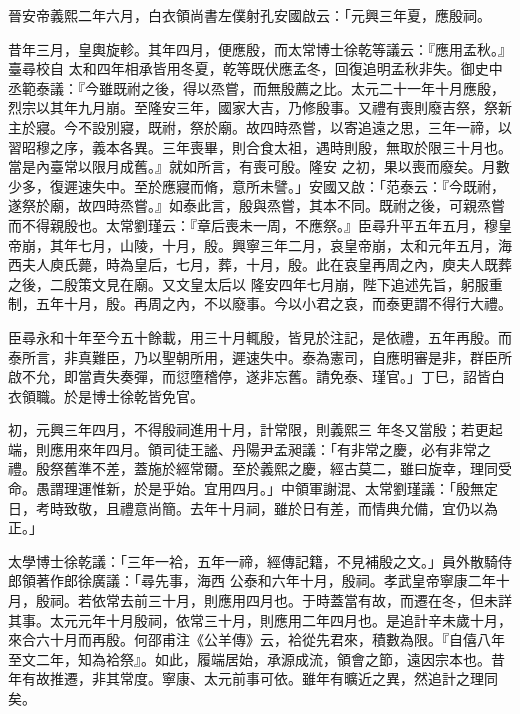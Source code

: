 \begin{pinyinscope}
 晉安帝義熙二年六月，白衣領尚書左僕射孔安國啟云：「元興三年夏，應殷祠。



 昔年三月，皇輿旋軫。其年四月，便應殷，而太常博士徐乾等議云：『應用孟秋。』臺尋校自
 太和四年相承皆用冬夏，乾等既伏應孟冬，回復追明孟秋非失。御史中丞範泰議：『今雖既祔之後，得以烝嘗，而無殷薦之比。太元二十一年十月應殷，烈宗以其年九月崩。至隆安三年，國家大吉，乃修殷事。又禮有喪則廢吉祭，祭新主於寢。今不設別寢，既祔，祭於廟。故四時烝嘗，以寄追遠之思，三年一禘，以習昭穆之序，義本各異。三年喪畢，則合食太祖，遇時則殷，無取於限三十月也。當是內臺常以限月成舊。』就如所言，有喪可殷。隆安
 之初，果以喪而廢矣。月數少多，復遲速失中。至於應寢而脩，意所未譬。」安國又啟：「范泰云：『今既祔，遂祭於廟，故四時烝嘗。』如泰此言，殷與烝嘗，其本不同。既祔之後，可親烝嘗而不得親殷也。太常劉瑾云：『章后喪未一周，不應祭。』臣尋升平五年五月，穆皇帝崩，其年七月，山陵，十月，殷。興寧三年二月，哀皇帝崩，太和元年五月，海西夫人庾氏薨，時為皇后，七月，葬，十月，殷。此在哀皇再周之內，庾夫人既葬之後，二殷策文見在廟。又文皇太后以
 隆安四年七月崩，陛下追述先旨，躬服重制，五年十月，殷。再周之內，不以廢事。今以小君之哀，而泰更謂不得行大禮。



 臣尋永和十年至今五十餘載，用三十月輒殷，皆見於注記，是依禮，五年再殷。而泰所言，非真難臣，乃以聖朝所用，遲速失中。泰為憲司，自應明審是非，群臣所啟不允，即當責失奏彈，而愆墮稽停，遂非忘舊。請免泰、瑾官。」丁巳，詔皆白衣領職。於是博士徐乾皆免官。



 初，元興三年四月，不得殷祠進用十月，計常限，則義熙三
 年冬又當殷；若更起端，則應用來年四月。領司徒王謐、丹陽尹孟昶議：「有非常之慶，必有非常之禮。殷祭舊準不差，蓋施於經常爾。至於義熙之慶，經古莫二，雖曰旋幸，理同受命。愚謂理運惟新，於是乎始。宜用四月。」中領軍謝混、太常劉瑾議：「殷無定日，考時致敬，且禮意尚簡。去年十月祠，雖於日有差，而情典允備，宜仍以為正。」



 太學博士徐乾議：「三年一袷，五年一禘，經傳記籍，不見補殷之文。」員外散騎侍郎領著作郎徐廣議：「尋先事，海西
 公泰和六年十月，殷祠。孝武皇帝寧康二年十月，殷祠。若依常去前三十月，則應用四月也。于時蓋當有故，而遷在冬，但未詳其事。太元元年十月殷祠，依常三十月，則應用二年四月也。是追計辛未歲十月，來合六十月而再殷。何邵甫注《公羊傳》云，袷從先君來，積數為限。『自僖八年至文二年，知為袷祭』。如此，履端居始，承源成流，領會之節，遠因宗本也。昔年有故推遷，非其常度。寧康、太元前事可依。雖年有曠近之異，然追計之理同矣。




\end{pinyinscope}
